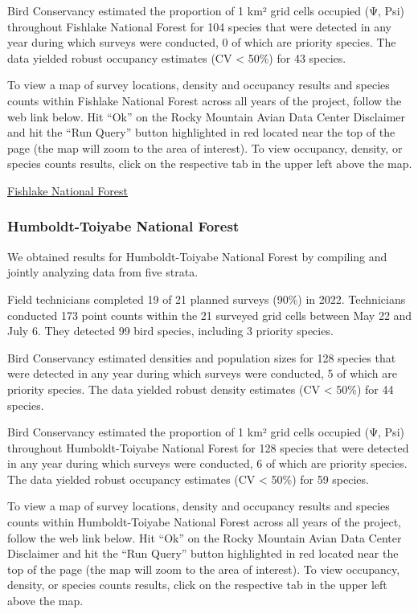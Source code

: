 \documentclass[
  letterpaper,
  DIV=11,
  numbers=noendperiod,
  oneside]{scrreprt}
\begin{document}
Bird Conservancy estimated the proportion of 1 km² grid cells occupied
(Ψ, Psi) throughout Fishlake National Forest for 104 species that were
detected in any year during which surveys were conducted, 0 of which are
priority species. The data yielded robust occupancy estimates (CV
\textless{} 50\%) for 43 species.

To view a map of survey locations, density and occupancy results and
species counts within Fishlake National Forest across all years of the
project, follow the web link below. Hit ``Ok'' on the Rocky Mountain
Avian Data Center Disclaimer and hit the ``Run Query'' button
highlighted in red located near the top of the page (the map will zoom
to the area of interest). To view occupancy, density, or species counts
results, click on the respective tab in the upper left above the map.

\href{http://www.rmbo.org/new_site/adc/QueryWindow.aspx\#N4IgzgrgDgpgTmALnAhoiBbEAuABCAMQEswALAGxQGsZcA5NIgewDsVzcCm4YkQBfIA=}{Fishlake
National Forest}

\hypertarget{humboldt-toiyabe-national-forest}{%
\subsubsection{Humboldt-Toiyabe National
Forest}\label{humboldt-toiyabe-national-forest}}

We obtained results for Humboldt-Toiyabe National Forest by compiling
and jointly analyzing data from five strata.

Field technicians completed 19 of 21 planned surveys (90\%) in 2022.
Technicians conducted 173 point counts within the 21 surveyed grid cells
between May 22 and July 6. They detected 99 bird species, including 3
priority species.

Bird Conservancy estimated densities and population sizes for 128
species that were detected in any year during which surveys were
conducted, 5 of which are priority species. The data yielded robust
density estimates (CV \textless{} 50\%) for 44 species.

Bird Conservancy estimated the proportion of 1 km² grid cells occupied
(Ψ, Psi) throughout Humboldt-Toiyabe National Forest for 128 species
that were detected in any year during which surveys were conducted, 6 of
which are priority species. The data yielded robust occupancy estimates
(CV \textless{} 50\%) for 59 species.

To view a map of survey locations, density and occupancy results and
species counts within Humboldt-Toiyabe National Forest across all years
of the project, follow the web link below. Hit ``Ok'' on the Rocky
Mountain Avian Data Center Disclaimer and hit the ``Run Query'' button
highlighted in red located near the top of the page (the map will zoom
to the area of interest). To view occupancy, density, or species counts
results, click on the respective tab in the upper left above the map.
\end{document}

